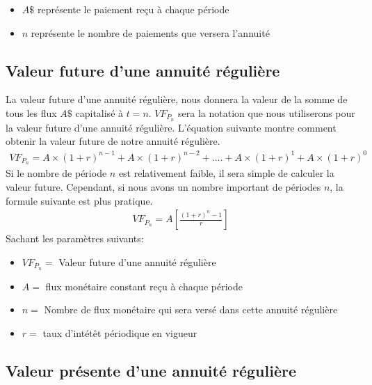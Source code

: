 \documentclass[12pt]{article}
\begin{document}
\begin{itemize}
\item $A\$$ représente le paiement reçu à chaque période 
\item $n$ représente le nombre de paiements que versera l'annuité
\end{itemize}

\subsection{Valeur future d'une annuité régulière}

La valeur future d'une annuité régulière, nous donnera la valeur de la somme de tous les flux $A\$$ capitalisé à $t=n$. $VF_{P_n}$ sera la notation que nous utiliserons pour la valeur future d'une annuité régulière. L'équation suivante montre comment obtenir la valeur future de notre annuité régulière.  
\begin{align*}
VF_{P_n} = A \times (1+r)^{n-1}+A \times (1+r)^{n-2}+....+A \times (1+r)^{1}+A \times (1+r)^{0}
\end{align*}
Si le nombre de période $n$ est relativement faible, il sera simple de calculer la valeur future. Cependant, si nous avons un nombre important de périodes $n$, la formule suivante est plus pratique. 
\begin{align*}
VF_{P_n}=A \left[\frac{(1+r)^n-1}{r} \right]
\end{align*}
Sachant les paramètres suivants: 
\begin{itemize}
\item $VF_{P_n}=$ Valeur future d'une annuité régulière 
\item $A=$ flux monétaire constant reçu à chaque période  
\item $n=$ Nombre de flux monétaire qui sera versé dans cette annuité régulière
\item $r=$ taux d'intétêt périodique en vigueur 
\end{itemize}


\subsection{Valeur présente d'une annuité régulière}
\end{document}
